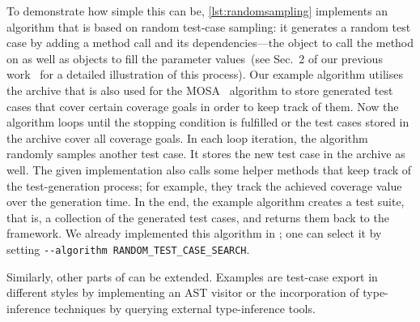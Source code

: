 To demonstrate how simple this can be,
\cref{lst:randomsampling} implements an algorithm
that is based on random test-case sampling:
it generates a random test case by adding a method call
and its dependencies—the object to call the method on
as well as objects to fill the parameter values~(see Sec.~2 of our
previous work~\cite{LKF21} for a detailed illustration of this process).
%
Our example algorithm utilises the archive
that is also used for the MOSA~\cite{PKT15} algorithm
to store generated test cases
that cover certain coverage goals in order to keep track of them.
%
Now the algorithm loops until the stopping condition is fulfilled
or the test cases stored in the archive
cover all coverage goals.
%
In each loop iteration,
the algorithm randomly samples another test case.
%
It stores the new test case in the archive as well.
%
The given implementation also calls some helper methods
that keep track of the test-generation process;
for example,
they track the achieved coverage value
over the generation time.
%
In the end,
the example algorithm creates a test suite,
that is, a collection of the generated test cases,
and returns them back to the framework.
%
We already implemented this algorithm in \pynguin;
one can select it by setting
\verb!--algorithm RANDOM_TEST_CASE_SEARCH!.
%

Similarly,
other parts of \pynguin can be extended.
%
Examples are test-case export in different styles
by implementing an AST visitor
or the incorporation of type-inference techniques
by querying external type-inference tools.
%

